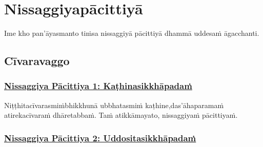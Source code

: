 
\section{Nissaggiyapācittiyā}
\label{np}

\begin{intro}
	Ime kho pan'āyasmanto tiṁsa nissaggiyā pācittiyā dhammā uddesaṁ āgacchanti.
\end{intro}
\setsubsecheadstyle{\subsectionFmt}
\subsection{Cīvaravaggo}

\subsubsection*{\hyperref[forf-exp1]{Nissaggiya Pācittiya 1: Kaṭhinasikkhāpadaṁ}}
\label{np1}

Niṭṭhitacīvarasmiṁ\makeatletter\hyperlink{endnote119-appendix}\makeatother \thinspace bhikkhunā ubbhatasmiṁ kaṭhine,\makeatletter\hyperlink{endnote120-appendix}\makeatother \thinspace das'āhaparamaṁ atirekacīvaraṁ dhāretabbaṁ. Taṁ atikkāmayato, nissaggiyaṁ pācittiyaṁ.



\subsubsection*{\hyperref[forf-exp2]{Nissaggiya Pācittiya 2: Uddositasikkhāpadaṁ}}
\label{np2}

